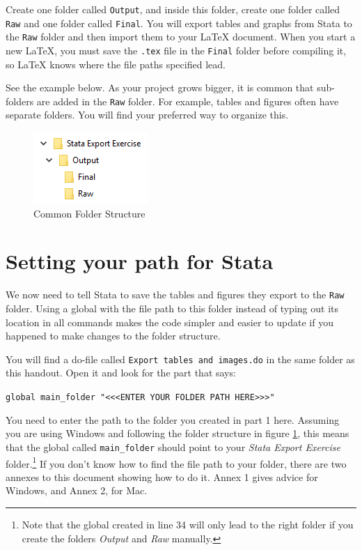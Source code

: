 \documentclass[]{article}
\begin{document}
Create one folder called \texttt{Output}, and inside this folder, create one folder called \texttt{Raw} and one folder called \texttt{Final}. You will export tables and graphs from Stata to the \texttt{Raw} folder and then import them to your {\LaTeX} document. When you start a new {\LaTeX}, you must save the \texttt{.tex} file in the \texttt{Final} folder before compiling it, so {\LaTeX} knows where the file paths specified lead.

See the example below. As your project grows bigger, it is common that sub-folders are added in the \texttt{Raw} folder. For example, tables and figures often have separate folders. You will find your preferred way to organize this.

\begin{figure}[H]
	\centering
	\includegraphics[width=0.3\linewidth]{img/outputRawFolders}
	\caption{Common Folder Structure}
	\label{fig:folder_structure}
\end{figure} 


\section{Setting your path for Stata}
We now need to tell Stata to save the tables and figures they export to the \texttt{Raw} folder. Using a global with the file path to this folder instead of typing out its location in all commands makes the code simpler and easier to update if you happened to make changes to the folder structure.

You will find a do-file called \texttt{Export tables and images.do} in the same folder as this handout. Open it and look for the part that says:
\begin{center}
	\verb|global main_folder "<<<ENTER YOUR FOLDER PATH HERE>>>"|
\end{center}

You need to enter the path to the folder you created in part 1 here. Assuming you are using Windows and following the folder structure in figure \ref{fig:folder_structure}, this means that the global called \verb|main_folder| should point to your \emph{Stata Export Exercise} folder.\footnote{Note that the global created in line 34 will only lead to the right folder if you create the folders \emph{Output} and \emph{Raw} manually.} If you don't know how to find the file path to your folder, there are two annexes to this document showing how to do it. Annex 1 gives advice for Windows, and Annex 2, for Mac.
\end{document}
